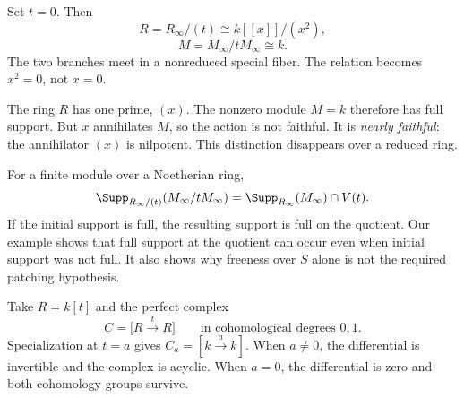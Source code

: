 \begin{minipage}[c]{.47\linewidth}
\end{minipage}\hfill
\begin{minipage}[c]{.49\linewidth}
Set $t=0$. Then
\[
R=R_\infty/(t)\cong k[[x]]/(x^2),
\]
\[
M=M_\infty/tM_\infty\cong k.
\]
The two branches meet in a nonreduced special fiber. The relation becomes $x^2=0$, not $x=0$.
\end{minipage}

The ring $R$ has one prime, $(x)$. The nonzero module $M=k$ therefore has full support. But $x$ annihilates $M$, so the action is not faithful. It is \emph{nearly faithful}: the annihilator $(x)$ is nilpotent. This distinction disappears over a reduced ring.

For a finite module over a Noetherian ring,
\[
\Supp_{R_\infty/(t)}(M_\infty/tM_\infty)
=\Supp_{R_\infty}(M_\infty)\cap V(t).
\]
If the initial support is full, the resulting support is full on the quotient. Our example shows that full support at the quotient can occur even when initial support was not full. It also shows why freeness over $S$ alone is not the required patching hypothesis.


Take $R=k[t]$ and the perfect complex
\[
C=\bigl[R\xrightarrow{\;t\;}R\bigr]
\qquad\text{in cohomological degrees }0,1.
\]
Specialization at $t=a$ gives $C_a=[k\xrightarrow{a}k]$. When $a\ne0$, the differential is invertible and the complex is acyclic. When $a=0$, the differential is zero and both cohomology groups survive.



